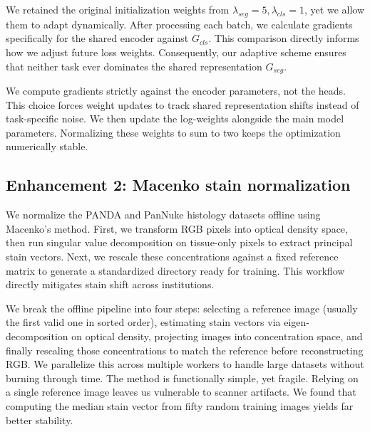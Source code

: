 \documentclass[conference,a4paper]{IEEEtran}
\begin{document}
We retained the original initialization weights from $\lambda_{seg}=5, \lambda_{cls}=1$, yet we allow them to adapt dynamically. After processing each batch, we calculate gradients specifically for the shared encoder against $G_{cls}$. This comparison directly informs how we adjust future loss weights. Consequently, our adaptive scheme ensures that neither task ever dominates the shared representation $G_{seg}$.

We compute gradients strictly against the encoder parameters, not the heads. This choice forces weight updates to track shared representation shifts instead of task-specific noise. We then update the log-weights alongside the main model parameters. Normalizing these weights to sum to two keeps the optimization numerically stable.

\subsection{Enhancement 2: Macenko stain normalization}
We normalize the PANDA and PanNuke histology datasets offline using Macenko’s method. First, we transform RGB pixels into optical density space, then run singular value decomposition on tissue-only pixels to extract principal stain vectors. Next, we rescale these concentrations against a fixed reference matrix to generate a standardized directory ready for training. This workflow directly mitigates stain shift across institutions.

We break the offline pipeline into four steps: selecting a reference image (usually the first valid one in sorted order), estimating stain vectors via eigen-decomposition on optical density, projecting images into concentration space, and finally rescaling those concentrations to match the reference before reconstructing RGB. We parallelize this across multiple workers to handle large datasets without burning through time. The method is functionally simple, yet fragile. Relying on a single reference image leaves us vulnerable to scanner artifacts. We found that computing the median stain vector from fifty random training images yields far better stability.
\end{document}

